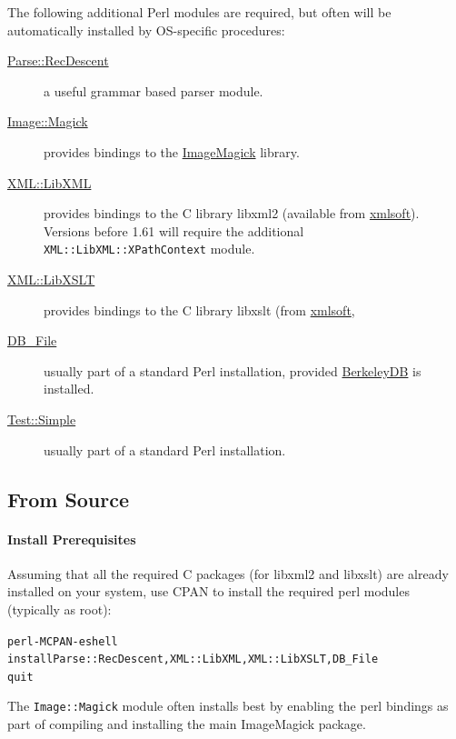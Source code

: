 \documentclass{article}
\begin{document}
The following additional Perl modules are required, but often will
be automatically installed by OS-specific procedures:
\begin{description}
\item[\href{http://search.cpan.org/search?query=Parse::RecDescent&mode=module}{Parse::RecDescent}]
    a useful grammar based parser module.
\item[\href{http://search.cpan.org/search?query=Image::Magick&mode=module}{Image::Magick}]
    provides bindings to the \href{http://www.imagemagick.org/}{ImageMagick} library.
\item[\href{http://search.cpan.org/search?query=XML::LibXML&mode=module}{XML::LibXML}]
    provides bindings to the C library libxml2
    (available from \href{http://www.xmlsoft.org}{xmlsoft}).
    Versions before 1.61 will require the additional \texttt{XML::LibXML::XPathContext} module.
\item[\href{http://search.cpan.org/search?query=XML::LibXSLT&mode=module}{XML::LibXSLT}]
    provides bindings to the C library libxslt
    (from \href{http://www.xmlsoft.org}{xmlsoft},
\item[\href{http://search.cpan.org/search?query=DB_File&mode=module}{DB\_File}]
    usually part of a standard Perl installation, provided
    \href{http://www.sleepycat.com}{BerkeleyDB} is installed.
\item[\href{http://search.cpan.org/search?query=Test::Simple&mode=module}{Test::Simple}]
    usually part of a standard Perl installation.
\end{description}

\subsection{From Source}\label{install.source}
\paragraph{Install Prerequisites}
Assuming that all the required C packages (for libxml2 and libxslt) are already installed on your system,
  use CPAN to install the required perl modules (typically as root):
\begin{alltt}
   perl -MCPAN -e shell
   install Parse::RecDescent, XML::LibXML, XML::LibXSLT, DB_File
   quit
\end{alltt}
The \texttt{Image::Magick} module often installs best by enabling the
perl bindings as part of compiling and installing the main ImageMagick package.
\end{document}
